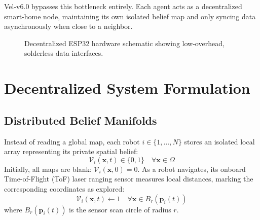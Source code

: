 \documentclass[letterpaper, 10pt, conference]{IEEEtran}
\begin{document}
Vel-v6.0 bypasses this bottleneck entirely. Each agent acts as a decentralized smart-home node, maintaining its own isolated belief map and only syncing data asynchronously when close to a neighbor.

\begin{figure}[htbp]
\centering
{}
\caption{Decentralized ESP32 hardware schematic showing low-overhead, solderless data interfaces.}
\label{fig:hardware_platform}
\end{figure}

\section{Decentralized System Formulation}
\label{sec:formulation}

\subsection{Distributed Belief Manifolds}
Instead of reading a global map, each robot $i \in \{1, \dots, N\}$ stores an isolated local array representing its private spatial belief:
\begin{equation}
    \mathcal{V}_i(\mathbf{x}, t) \in \{0, 1\} \quad \forall \mathbf{x} \in \Omega
\end{equation}
Initially, all maps are blank: $\mathcal{V}_i(\mathbf{x}, 0) = 0$. As a robot navigates, its onboard Time-of-Flight (ToF) laser ranging sensor measures local distances, marking the corresponding coordinates as explored:
\begin{equation}
    \mathcal{V}_i(\mathbf{x}, t) \leftarrow 1 \quad \forall \mathbf{x} \in B_r(\mathbf{p}_i(t))
\end{equation}
where $B_r(\mathbf{p}_i(t))$ is the sensor scan circle of radius $r$.
\end{document}
